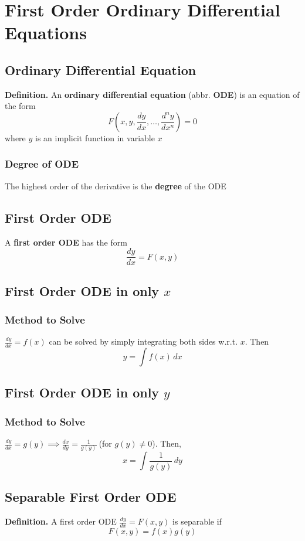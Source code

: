 \documentclass[../ma2002_notes.tex]{subfiles}
\begin{document}
\section{First Order Ordinary Differential Equations}
\subsection{Ordinary Differential Equation}
\textbf{Definition.} An \textbf{ordinary differential equation} (abbr. \textbf{ODE}) is an equation of the form
\[F(x,y,\frac{dy}{dx},\ldots,\frac{d^ny}{dx^n})=0\]
where \(y\) is an implicit function in variable \(x\)

\subsubsection{Degree of ODE}
The highest order of the derivative is the \textbf{degree} of the ODE

\subsection{First Order ODE}
A \textbf{first order ODE} has the form
\[\frac{dy}{dx}=F(x,y)\]

\subsection{First Order ODE in only $x$}
\subsubsection{Method to Solve}
\(\displaystyle\frac{dy}{dx}=f(x)\) can be solved by simply integrating both sides w.r.t. \(x\). Then
\[y=\int f(x)\,dx\]

\subsection{First Order ODE in only $y$}
\subsubsection{Method to Solve}
\(\displaystyle\frac{dy}{dx}=g(y)\implies\frac{dx}{dy}=\frac{1}{g(y)}\ \)(for \(g(y)\ne0\)). Then,
\[x=\int\frac{1}{g(y)}\,dy\]

\subsection{Separable First Order ODE}
\textbf{Definition.} A first order ODE \(\displaystyle\frac{dy}{dx}=F(x,y)\) is separable if
\[F(x,y)=f(x)g(y)\]
\end{document}
